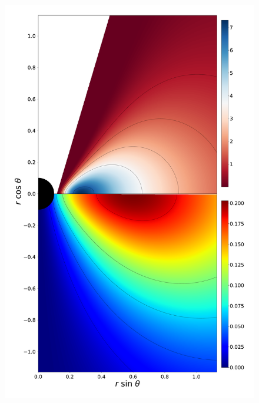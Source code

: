 \documentclass[twocolumn,aps,showpacs,showkeys,prd,superscriptaddress,byrevtex, amsmath]{revtex4-1}
\begin{document}
\begin{figure}
\includegraphics[scale=0.12]{figures/fig5_IV_10.pdf}
\hspace{-0.3cm}

\end{figure}
\end{document}
